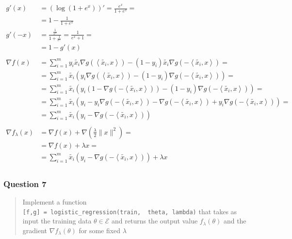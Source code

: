 \documentclass[
]{article}
\begin{document}
\begin{align}
g'(x) &= (\log(1+e^x))' = \frac{e^x}{1+e^x} =\\
&= 1 - \frac{1}{1+e^x} \\
g'(-x) &= \frac{\frac{1}{e^x}}{1+\frac{1}{e^x}} = \frac{1}{e^x + 1} =\\
&= 1-g'(x) \\
\\

\nabla f(x) &= \sum^m_{i=1}
y_i\tilde{x_i}\nabla g(\left<\tilde{x_i},x\right>) -
(1-y_i)\tilde{x_i}\nabla g(-\left<\tilde{x_i},x\right>) =\\
&= \sum^m_{i=1}
\tilde{x_i}\left(y_i\nabla g(\left<\tilde{x_i},x\right>) -
(1-y_i)\nabla g(-\left<\tilde{x_i},x\right>) \right) =\\
&= \sum^m_{i=1}
\tilde{x_i}\left(y_i\left( 1 - \nabla g(-\left<\tilde{x_i},x\right>)\right) -
(1-y_i)\nabla g(-\left<\tilde{x_i},x\right>) \right) =\\
&= \sum^m_{i=1}
\tilde{x_i}\left(y_i - y_i\nabla g(-\left<\tilde{x_i},x\right>) -
\nabla g(-\left<\tilde{x_i},x\right>) + y_i\nabla g(-\left<\tilde{x_i},x\right>) \right) =\\
&= \sum^m_{i=1}
\tilde{x_i}\left(y_i -
\nabla g(-\left<\tilde{x_i},x\right>)\right) \\
\\

\nabla f_\lambda(x) &= \nabla f(x) + \nabla (\frac{\lambda}{2}\lVert x\rVert^2) =\\
&= \nabla f(x) + \lambda x =\\
&= \sum^m_{i=1}
\tilde{x_i}\left(y_i -
\nabla g(-\left<\tilde{x_i},x\right>)\right) + \lambda x
\\
\end{align}

\hypertarget{question-7}{%
\subsubsection{Question 7}\label{question-7}}

\begin{quote}
Implement a function
\texttt{{[}f,g{]}\ =\ logistic\_regression(train,\ \ theta,\ lambda)}
that takes as input the training data \(\theta\in\mathcal{E}\) and
returns the output value \(f_\lambda(\theta)\) and the gradient
\(\nabla f_\lambda(\theta)\) for some fixed \(\lambda\)
\end{quote}
\end{document}
